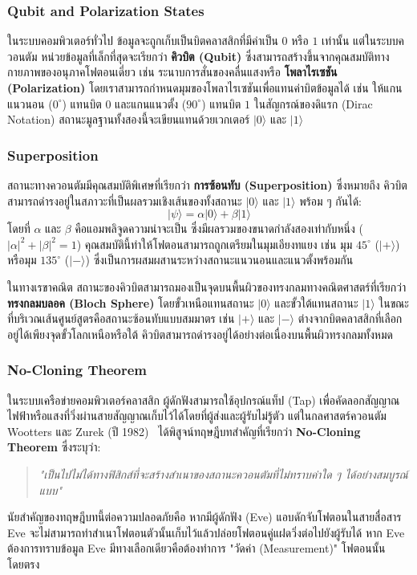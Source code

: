 \subsubsection{Qubit and Polarization States}
ในระบบคอมพิวเตอร์ทั่วไป ข้อมูลจะถูกเก็บเป็นบิตคลาสสิกที่มีค่าเป็น $0$ หรือ $1$ เท่านั้น แต่ในระบบควอนตัม หน่วยข้อมูลที่เล็กที่สุดจะเรียกว่า \textbf{คิวบิต (Qubit)} ซึ่งสามารถสร้างขึ้นจากคุณสมบัติทางกายภาพของอนุภาคโฟตอนเดี่ยว เช่น ระนาบการสั่นของคลื่นแสงหรือ \textbf{โพลาไรเซชัน (Polarization)} โดยเราสามารถกำหนดมุมของโพลาไรเซชันเพื่อแทนค่าบิตข้อมูลได้ เช่น ให้แกนแนวนอน ($0^\circ$) แทนบิต $0$ และแกนแนวตั้ง ($90^\circ$) แทนบิต $1$ ในสัญกรณ์ของดิแรก (Dirac Notation) สถานะมูลฐานทั้งสองนี้จะเขียนแทนด้วยเวกเตอร์ $|0\rangle$ และ $|1\rangle$

\subsubsection{Superposition}
สถานะทางควอนตัมมีคุณสมบัติพิเศษที่เรียกว่า \textbf{การซ้อนทับ (Superposition)} ซึ่งหมายถึง คิวบิตสามารถดำรงอยู่ในสภาวะที่เป็นผลรวมเชิงเส้นของทั้งสถานะ $|0\rangle$ และ $|1\rangle$ พร้อม ๆ กันได้:
\begin{equation}
    |\psi\rangle = \alpha |0\rangle + \beta |1\rangle
\end{equation}
โดยที่ $\alpha$ และ $\beta$ คือแอมพลิจูดความน่าจะเป็น ซึ่งมีผลรวมของขนาดกำลังสองเท่ากับหนึ่ง ($|\alpha|^2 + |\beta|^2 = 1$) คุณสมบัตินี้ทำให้โฟตอนสามารถถูกเตรียมในมุมเอียงทแยง เช่น มุม $45^\circ$ ($|+\rangle$) หรือมุม $135^\circ$ ($|-\rangle$) ซึ่งเป็นการผสมผสานระหว่างสถานะแนวนอนและแนวตั้งพร้อมกัน

ในทางเรขาคณิต สถานะของคิวบิตสามารถมองเป็นจุดบนพื้นผิวของทรงกลมทางคณิตศาสตร์ที่เรียกว่า \textbf{ทรงกลมบลอค (Bloch Sphere)} โดยขั้วเหนือแทนสถานะ $|0\rangle$ และขั้วใต้แทนสถานะ $|1\rangle$ ในขณะที่บริเวณเส้นศูนย์สูตรคือสถานะซ้อนทับแบบสมมาตร เช่น $|+\rangle$ และ $|-\rangle$ ต่างจากบิตคลาสสิกที่เลือกอยู่ได้เพียงจุดขั้วโลกเหนือหรือใต้ คิวบิตสามารถดำรงอยู่ได้อย่างต่อเนื่องบนพื้นผิวทรงกลมทั้งหมด

\subsubsection{No-Cloning Theorem}
ในระบบเครือข่ายคอมพิวเตอร์คลาสสิก ผู้ดักฟังสามารถใช้อุปกรณ์แท็ป (Tap) เพื่อคัดลอกสัญญาณไฟฟ้าหรือแสงที่วิ่งผ่านสายสัญญาณเก็บไว้ได้โดยที่ผู้ส่งและผู้รับไม่รู้ตัว แต่ในกลศาสตร์ควอนตัม Wootters และ Zurek (ปี 1982)~\cite{wootters_zurek_nocloning} ได้พิสูจน์ทฤษฎีบทสำคัญที่เรียกว่า \textbf{No-Cloning Theorem} ซึ่งระบุว่า:
\begin{quote}
\textit{"เป็นไปไม่ได้ทางฟิสิกส์ที่จะสร้างสำเนาของสถานะควอนตัมที่ไม่ทราบค่าใด ๆ ได้อย่างสมบูรณ์แบบ"}
\end{quote}
นัยสำคัญของทฤษฎีบทนี้ต่อความปลอดภัยคือ หากมีผู้ดักฟัง (Eve) แอบดักจับโฟตอนในสายสื่อสาร Eve จะไม่สามารถทำสำเนาโฟตอนตัวนั้นเก็บไว้แล้วปล่อยโฟตอนคู่แฝดวิ่งต่อไปยังผู้รับได้ หาก Eve ต้องการทราบข้อมูล Eve มีทางเลือกเดียวคือต้องทำการ "วัดค่า (Measurement)" โฟตอนนั้นโดยตรง

